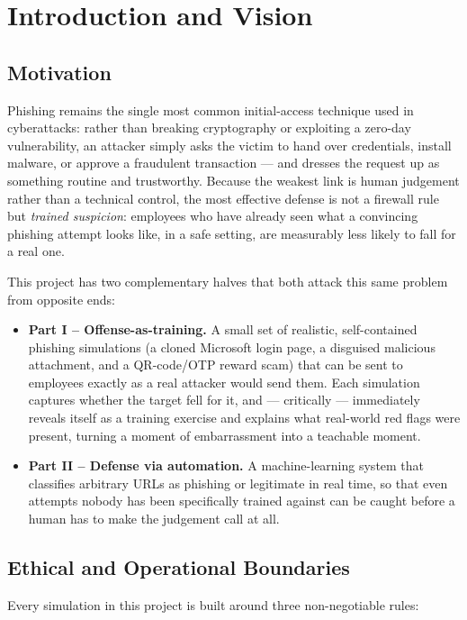 \documentclass[11pt,a4paper]{report}
\begin{document}
\chapter{Introduction and Vision}

\section{Motivation}
Phishing remains the single most common initial-access technique used in cyberattacks:
rather than breaking cryptography or exploiting a zero-day vulnerability, an attacker
simply asks the victim to hand over credentials, install malware, or approve a
fraudulent transaction --- and dresses the request up as something routine and
trustworthy. Because the weakest link is human judgement rather than a technical
control, the most effective defense is not a firewall rule but \emph{trained
suspicion}: employees who have already seen what a convincing phishing attempt looks
like, in a safe setting, are measurably less likely to fall for a real one.

This project has two complementary halves that both attack this same problem from
opposite ends:

\begin{itemize}[leftmargin=1.4em]
  \item \textbf{Part I -- Offense-as-training.} A small set of realistic, self-contained
  phishing simulations (a cloned Microsoft login page, a disguised malicious
  attachment, and a QR-code/OTP reward scam) that can be sent to employees exactly as
  a real attacker would send them. Each simulation captures whether the target fell
  for it, and --- critically --- immediately reveals itself as a training exercise and
  explains what real-world red flags were present, turning a moment of embarrassment
  into a teachable moment.
  \item \textbf{Part II -- Defense via automation.} A machine-learning system that
  classifies arbitrary URLs as phishing or legitimate in real time, so that even
  attempts nobody has been specifically trained against can be caught before a human
  has to make the judgement call at all.
\end{itemize}

\section{Ethical and Operational Boundaries}
Every simulation in this project is built around three non-negotiable rules:
\end{document}
